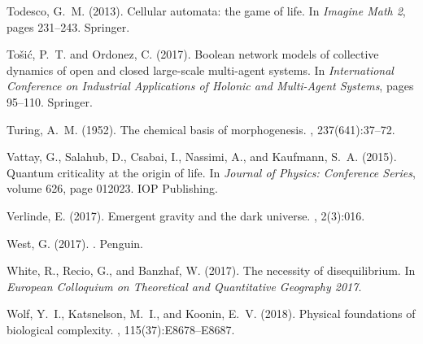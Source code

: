 \begin{thebibliography}{}
Todesco, G.~M. (2013).
\newblock Cellular automata: the game of life.
\newblock In {\em Imagine Math 2}, pages 231--243. Springer.

To{\v{s}}i{\'c}, P.~T. and Ordonez, C. (2017).
\newblock Boolean network models of collective dynamics of open and closed
  large-scale multi-agent systems.
\newblock In {\em International Conference on Industrial Applications of
  Holonic and Multi-Agent Systems}, pages 95--110. Springer.

Turing, A.~M. (1952).
\newblock The chemical basis of morphogenesis.
, 237(641):37--72.

Vattay, G., Salahub, D., Csabai, I., Nassimi, A., and Kaufmann, S.~A. (2015).
\newblock Quantum criticality at the origin of life.
\newblock In {\em Journal of Physics: Conference Series}, volume 626, page
  012023. IOP Publishing.

Verlinde, E. (2017).
\newblock Emergent gravity and the dark universe.
, 2(3):016.

West, G. (2017).
.
\newblock Penguin.

White, R., Recio, G., and Banzhaf, W. (2017).
\newblock The necessity of disequilibrium.
\newblock In {\em European Colloquium on Theoretical and Quantitative Geography
  2017}.

Wolf, Y.~I., Katsnelson, M.~I., and Koonin, E.~V. (2018).
\newblock Physical foundations of biological complexity.
,
  115(37):E8678--E8687.

\end{thebibliography}






